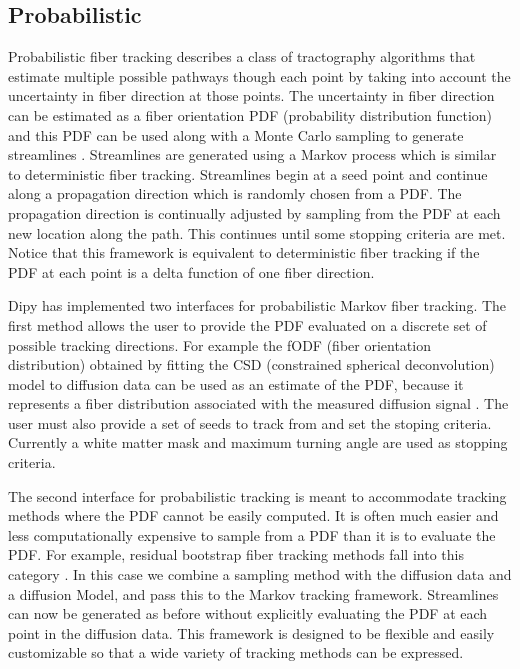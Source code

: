 \documentclass{bioinfo}
\begin{document}
\subsection{Probabilistic}

Probabilistic fiber tracking describes a class of tractography algorithms that
estimate multiple possible pathways though each point by taking into
account the uncertainty in fiber direction at those points. The uncertainty in
fiber direction can be estimated as a fiber orientation PDF (probability distribution
function) and this PDF can be used along with a Monte Carlo sampling to
generate streamlines \citep{morris2008probabilistic}. Streamlines are generated using a
Markov process which is similar to deterministic fiber tracking. Streamlines begin
at a seed point and continue along a propagation direction which is randomly
chosen from a PDF. The propagation direction is continually adjusted by
sampling from the PDF at each new location along the path. This continues until
some stopping criteria are met. Notice that this framework is equivalent to
deterministic fiber tracking if the PDF at each point is a delta function of
one fiber direction.

Dipy has implemented two interfaces for probabilistic Markov fiber tracking. The
first method allows the user to provide the PDF evaluated on a discrete set of
possible tracking directions. For example the fODF (fiber orientation distribution)
obtained by fitting the CSD (constrained spherical deconvolution) model to diffusion
data can be used as an estimate of the PDF, because it represents a fiber distribution
associated with the measured diffusion signal \citep{jeurissen2011probabilistic}. The user must
also provide a set of seeds to track from and set the stoping criteria. Currently a white matter mask and maximum turning angle are used as stopping criteria.

The second interface for probabilistic tracking is meant to accommodate	tracking
methods where the PDF cannot be easily computed. It is often much easier and less
computationally expensive to sample from a PDF than it is to evaluate the PDF. For
example, residual bootstrap fiber tracking methods fall into this category \citep{berman2008probabilistic}.
In this case we combine a sampling method with the diffusion data and a diffusion Model,
and pass this to the Markov tracking framework. Streamlines can now be generated
as before without explicitly evaluating the PDF at each
point in the diffusion data. This framework is designed to be flexible and easily
customizable so that a wide variety of tracking methods can be expressed.
\end{document}
